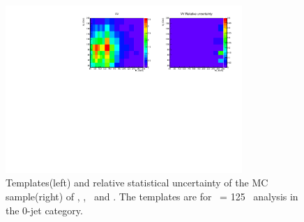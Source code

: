 \begin{figure}[htp]
\includegraphics[width=0.8\textwidth]{figures/2dtemplate_VV_mH125_0j.pdf}
\caption{Templates(left) and relative statistical uncertainty of the MC sample(right) 
of \qqww, \ggww, \topbkg\ and \vv. 
The templates are for \mHi\ = 125 \GeV\ analysis in the 0-jet category.}
\label{fig:2dtemplate_125_0j_2}
\end{figure}

